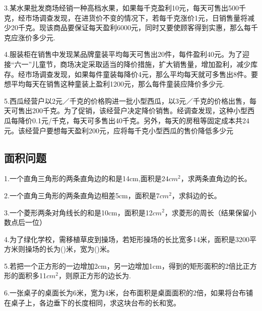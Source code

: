 3.某水果批发商场经销一种高档水果，如果每千克盈利10元，每天可售出500千克，经市场调查发现，在进货价不变的情况下，若每千克涨价1元，日销售量将减少20千克。现该商品要保证每天盈利6000元，同时又要使顾客得到实惠，那么每千克应涨价多少元.\par
\vspace{2cm}

4.服装柜在销售中发现某品牌童装平均每天可售出20件，每件盈利40元。为了迎接“六一”儿童节，商场决定采取适当的降价措施，扩大销售量，增加盈利，减少库存。经市场调查发现，如果每件童装每降价4元，那么平均每天就可多售出8件。要想平均每天在销售这种童装上盈利1200元，那么每件童装应降价多少元.\par
\vspace{2cm}

5.西瓜经营户以$2$元／千克的价格购进一批小型西瓜，以3元／千克的价格出售，每天可售出200千克。为了促销，该经营户决定降价销售。经调查发现，这种小型西瓜每降价0.1元/千克，每天可多售出40千克。另外，每天的房租等固定成本共24元。该经营户要想每天盈利200元，应将每千克小型西瓜的售价降低多少元\par


\subsection{面积问题}
1.一个直角三角形的两条直角边的和是14cm,面积是$24cm^2$，求两条直角边的长。\par
\vspace{2cm}

2.一个直角三角形的两条直角边相差5cm，面积是7$cm^2$，求斜边的长。\par
\vspace{2cm}

3.一个菱形两条对角线长的和是10cm，面积是12$cm^2$，求菱形的周长（结果保留小数点后一位）\par
\vspace{2cm}

4.为了绿化学校，需移植草皮到操场，若矩形操场的长比宽多14米，面积是3200平方米则操场的长为()米，宽为()米。\par
\vspace{2cm}

5.若把一个正方形的一边增加2cm，另一边增加1cm，得到的矩形面积的2倍比正方形的面积多11$cm^2$，则原正方形的边长为.\par
\vspace{2cm}

6.一张桌子的桌面长为6米，宽为4米，台布面积是桌面面积的2倍，如果将台布铺在桌子上，各边垂下的长度相同，求这块台布的长和宽。\par
\vspace{2cm}

